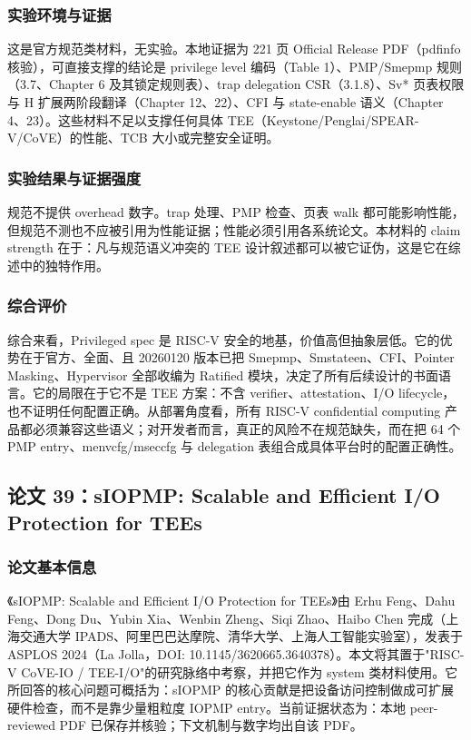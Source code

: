 \documentclass[11pt]{ctexart}
\begin{document}
\subsubsection{实验环境与证据}
这是官方规范类材料，无实验。本地证据为 221 页 Official Release PDF（pdfinfo 核验），可直接支撑的结论是 privilege level 编码（Table 1）、PMP/Smepmp 规则（3.7、Chapter 6 及其锁定规则表）、trap delegation CSR（3.1.8）、Sv* 页表权限与 H 扩展两阶段翻译（Chapter 12、22）、CFI 与 state-enable 语义（Chapter 4、23）。这些材料不足以支撑任何具体 TEE（Keystone/Penglai/SPEAR-V/CoVE）的性能、TCB 大小或完整安全证明。\par
\subsubsection{实验结果与证据强度}
规范不提供 overhead 数字。trap 处理、PMP 检查、页表 walk 都可能影响性能，但规范不测也不应被引用为性能证据；性能必须引用各系统论文。本材料的 claim strength 在于：凡与规范语义冲突的 TEE 设计叙述都可以被它证伪，这是它在综述中的独特作用。\par
\subsubsection{综合评价}
综合来看，Privileged spec 是 RISC-V 安全的地基，价值高但抽象层低。它的优势在于官方、全面、且 20260120 版本已把 Smepmp、Smstateen、CFI、Pointer Masking、Hypervisor 全部收编为 Ratified 模块，决定了所有后续设计的书面语言。它的局限在于它不是 TEE 方案：不含 verifier、attestation、I/O lifecycle，也不证明任何配置正确。从部署角度看，所有 RISC-V confidential computing 产品都必须兼容这些语义；对开发者而言，真正的风险不在规范缺失，而在把 64 个 PMP entry、menvcfg/mseccfg 与 delegation 表组合成具体平台时的配置正确性。\par
\subsection{论文 39：sIOPMP: Scalable and Efficient I/O Protection for TEEs}
\subsubsection{论文基本信息}
《sIOPMP: Scalable and Efficient I/O Protection for TEEs》由 Erhu Feng、Dahu Feng、Dong Du、Yubin Xia、Wenbin Zheng、Siqi Zhao、Haibo Chen 完成（上海交通大学 IPADS、阿里巴巴达摩院、清华大学、上海人工智能实验室），发表于 ASPLOS 2024（La Jolla，DOI: 10.1145/3620665.3640378）。本文将其置于"RISC-V CoVE-IO / TEE-I/O"的研究脉络中考察，并把它作为 system 类材料使用。它所回答的核心问题可概括为：sIOPMP 的核心贡献是把设备访问控制做成可扩展硬件检查，而不是靠少量粗粒度 IOPMP entry。当前证据状态为：本地 peer-reviewed PDF 已保存并核验；下文机制与数字均出自该 PDF。\cite{feng2024siopmp}\par
\end{document}

